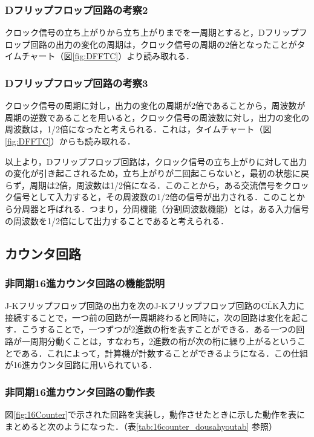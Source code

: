 %
%
\subsubsection{Dフリップフロップ回路の考察2}
\label{DFF_consideration2}
クロック信号の立ち上がりから立ち上がりまでを一周期とすると，Dフリップフロップ回路の出力の変化の周期は，クロック信号の周期の2倍となったことがタイムチャート（図\ref{fig:DFFTC}）より読み取れる．
%
%
\subsubsection{Dフリップフロップ回路の考察3}
\label{DFF_consideration3}
クロック信号の周期に対し，出力の変化の周期が2倍であることから，周波数が周期の逆数であることを用いると，クロック信号の周波数に対し，出力の変化の周波数は，1/2倍になったと考えられる．これは，タイムチャート（図\ref{fig:DFFTC}）からも読み取れる．
\\
\par
以上より，Dフリップフロップ回路は，クロック信号の立ち上がりに対して出力の変化が引き起こされるため，立ち上がりが二回起こらないと，最初の状態に戻らず，周期は2倍，周波数は1/2倍になる．このことから，ある交流信号をクロック信号として入力すると，その周波数の1/2倍の信号が出力される．このことから分周器と呼ばれる．つまり，分周機能（分割周波数機能）とは，ある入力信号の周波数を1/2倍にして出力することであると考えられる．

%
%
\subsection{カウンタ回路}
\label{experiment_counter}

%
%
\subsubsection{非同期16進カウンタ回路の機能説明}
\label{16counter_explain}
J-Kフリップフロップ回路の出力を次のJ-Kフリップフロップ回路の$\overline{\mathrm{CLK}}$入力に接続することで，一つ前の回路が一周期終わると同時に，次の回路は変化を起こす．こうすることで，一つずつが2進数の桁を表すことができる．ある一つの回路が一周期分動くことは，すなわち，2進数の桁が次の桁に繰り上がるということである．これによって，計算機が計数することができるようになる．この仕組が16進カウンタ回路に用いられている．

%
%
\subsubsection{非同期16進カウンタ回路の動作表}
\label{16counter_dousahyou}
図\ref{fig:16Counter}で示された回路を実装し，動作させたときに示した動作を表にまとめると次のようになった．（表\ref{tab:16counter_dousahyoutab} 参照）


